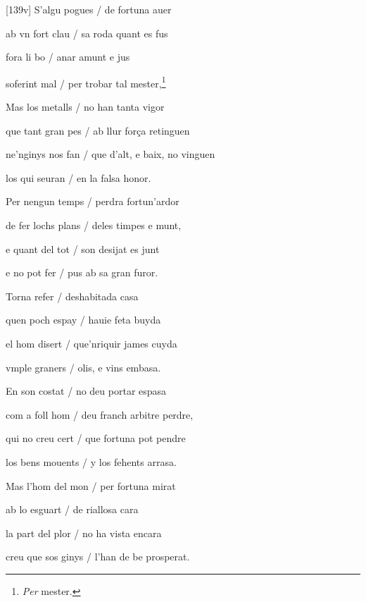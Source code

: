 \documentclass[12pt]{article}
\begin{document}
\begin{estrofa}

 [139v] S'algu pogues / de fortuna auer

 ab vn fort clau / sa roda quant es fus

 fora li bo / anar amunt e jus

 soferint mal / per trobar tal mester,\footnote{\textit{Per} mester.}

 Mas los metalls / no han tanta vigor

 que tant gran pes / ab llur for\c{c}a retinguen

 ne'nginys nos fan / que d'alt, e baix, no vinguen

 los qui seuran / en la falsa honor.

\end{estrofa}



\begin{estrofa}

 Per nengun temps / perdra fortun'ardor

 de fer lochs plans / deles timpes e munt,

 e quant del tot / son desijat es junt

 e no pot fer / pus ab sa gran furor.

 Torna refer / deshabitada casa

 quen poch espay / hauie feta buyda

 el hom disert / que'nriquir james cuyda

 vmple graners / olis, e vins embasa.

\end{estrofa}



\begin{estrofa}

 En son costat / no deu portar espasa

 com a foll hom / deu franch arbitre perdre,

 qui no creu cert / que fortuna pot pendre

 los bens mouents / y los fehents arrasa.

 Mas l'hom del mon / per fortuna mirat

 ab lo esguart / de riallosa cara

 la part del plor / no ha vista encara

 creu que sos ginys / l'han de be prosperat.

\end{estrofa}
\end{document}
